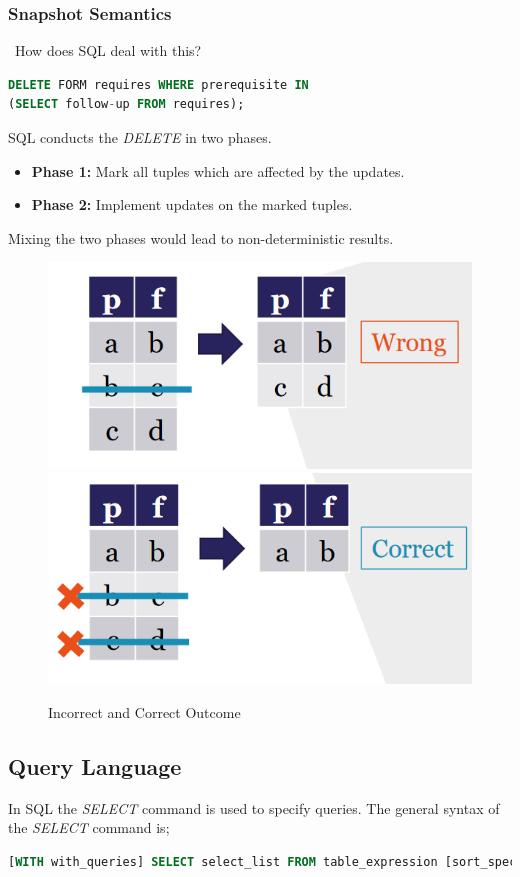 \subsubsection{Snapshot Semantics}\
How does SQL deal with this?
\begin{lstlisting}[language=SQL]
DELETE FORM requires WHERE prerequisite IN 
(SELECT follow-up FROM requires);
\end{lstlisting}
SQL conducts the \textit{DELETE} in two phases.
\begin{itemize}
\item \textbf{Phase 1:} {\color{orange} Mark} all tuples which are affected by the updates.
\item \textbf{Phase 2:} {\color{NavyBlue} Implement} updates on the marked tuples.
\end{itemize}
Mixing the two phases would lead to non-deterministic results.
\begin{figure}[H]
\centering
\includegraphics[width=.4\textwidth]{images/snapshot_semantics.PNG}
\includegraphics[width=.4\textwidth]{images/snapshot_semantics2.PNG}
\caption{Incorrect and Correct Outcome}
\label{snapshot_semantics}
\end{figure}

\subsection{Query Language}
In SQL the \textit{SELECT} command is used to specify queries. The general syntax of the \textit{SELECT} command is;
\begin{lstlisting}[language=SQL]
[WITH with_queries] SELECT select_list FROM table_expression [sort_specification]
\end{lstlisting}

